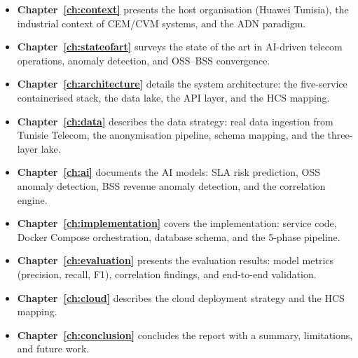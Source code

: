 \begin{itemize}
  \item \textbf{Chapter~\ref{ch:context}} presents the host organisation (Huawei Tunisia), the industrial context of CEM/CVM systems, and the ADN paradigm.
  \item \textbf{Chapter~\ref{ch:stateofart}} surveys the state of the art in AI-driven telecom operations, anomaly detection, and OSS--BSS convergence.
  \item \textbf{Chapter~\ref{ch:architecture}} details the system architecture: the five-service containerised stack, the data lake, the API layer, and the HCS mapping.
  \item \textbf{Chapter~\ref{ch:data}} describes the data strategy: real data ingestion from Tunisie Telecom, the anonymisation pipeline, schema mapping, and the three-layer lake.
  \item \textbf{Chapter~\ref{ch:ai}} documents the AI models: SLA risk prediction, OSS anomaly detection, BSS revenue anomaly detection, and the correlation engine.
  \item \textbf{Chapter~\ref{ch:implementation}} covers the implementation: service code, Docker Compose orchestration, database schema, and the 5-phase pipeline.
  \item \textbf{Chapter~\ref{ch:evaluation}} presents the evaluation results: model metrics (precision, recall, F1), correlation findings, and end-to-end validation.
  \item \textbf{Chapter~\ref{ch:cloud}} describes the cloud deployment strategy and the HCS mapping.
  \item \textbf{Chapter~\ref{ch:conclusion}} concludes the report with a summary, limitations, and future work.
\end{itemize}
